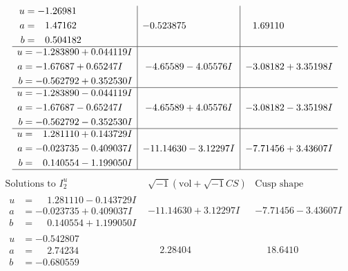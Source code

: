 \documentclass[1p]{elsarticle_modified}
\theoremstyle{definition}
\newcommand{\I}{\sqrt{-1}}
\begin{document}
$$\begin{array}{c|c|c}
\begin{aligned}
u &= -1.26981\phantom{ +0.000000I} \\
a &= \phantom{-}1.47162\phantom{ +0.000000I} \\
b &= \phantom{-}0.504182\phantom{ +0.000000I}\end{aligned}
 & -0.523875\phantom{ +0.000000I} & \phantom{-}1.69110\phantom{ +0.000000I} \\ \hline\begin{aligned}
u &= -1.283890 + 0.044119 I \\
a &= -1.67687 + 0.65247 I \\
b &= -0.562792 + 0.352530 I\end{aligned}
 & -4.65589 - 4.05576 I & -3.08182 + 3.35198 I \\ \hline\begin{aligned}
u &= -1.283890 - 0.044119 I \\
a &= -1.67687 - 0.65247 I \\
b &= -0.562792 - 0.352530 I\end{aligned}
 & -4.65589 + 4.05576 I & -3.08182 - 3.35198 I \\ \hline\begin{aligned}
u &= \phantom{-}1.281110 + 0.143729 I \\
a &= -0.023735 - 0.409037 I \\
b &= \phantom{-}0.140554 - 1.199050 I\end{aligned}
 & -11.14630 - 3.12297 I & -7.71456 + 3.43607 I\\
 \hline 
 \end{array}$$\newpage$$\begin{array}{c|c|c}  
\text{Solutions to }I^u_{2}& \I (\text{vol} + \sqrt{-1}CS) & \text{Cusp shape}\\
 \hline 
\begin{aligned}
u &= \phantom{-}1.281110 - 0.143729 I \\
a &= -0.023735 + 0.409037 I \\
b &= \phantom{-}0.140554 + 1.199050 I\end{aligned}
 & -11.14630 + 3.12297 I & -7.71456 - 3.43607 I \\ \hline\begin{aligned}
u &= -0.542807\phantom{ +0.000000I} \\
a &= \phantom{-}2.74234\phantom{ +0.000000I} \\
b &= -0.680559\phantom{ +0.000000I}\end{aligned}
 & \phantom{-}2.28404\phantom{ +0.000000I} & \phantom{-}18.6410\phantom{ +0.000000I} \\ \hline\begin{aligned}

\end{aligned}
\end{array}$$
\end{document}
